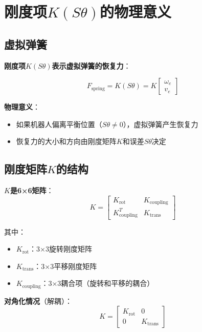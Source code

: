 \documentclass[12pt,a4paper]{article}
\begin{document}
\section{刚度项$K(S\theta)$的物理意义}

\subsection{虚拟弹簧}

\textbf{刚度项$K(S\theta)$表示虚拟弹簧的恢复力}：

\begin{equation}
F_{\text{spring}} = K(S\theta) = K \begin{bmatrix} \omega_e \\ v_e \end{bmatrix}
\end{equation}

\textbf{物理意义}：
\begin{itemize}
\item 如果机器人偏离平衡位置（$S\theta \neq 0$），虚拟弹簧产生恢复力
\item 恢复力的大小和方向由刚度矩阵$K$和误差$S\theta$决定
\end{itemize}

\subsection{刚度矩阵$K$的结构}

\textbf{$K$是6×6矩阵}：
\begin{equation}
K = \begin{bmatrix} K_{\text{rot}} & K_{\text{coupling}} \\ K_{\text{coupling}}^T & K_{\text{trans}} \end{bmatrix}
\end{equation}

其中：
\begin{itemize}
\item $K_{\text{rot}}$：3×3旋转刚度矩阵
\item $K_{\text{trans}}$：3×3平移刚度矩阵
\item $K_{\text{coupling}}$：3×3耦合项（旋转和平移的耦合）
\end{itemize}

\textbf{对角化情况}（解耦）：
\begin{equation}
K = \begin{bmatrix} K_{\text{rot}} & 0 \\ 0 & K_{\text{trans}} \end{bmatrix}
\end{equation}
\end{document}
